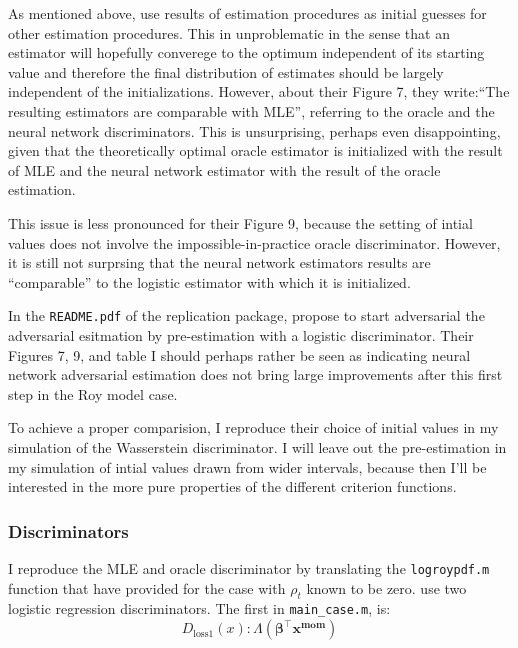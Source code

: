 As mentioned above, \textcite{kaji2023adversarial} use results of estimation procedures as initial guesses for other estimation procedures.
This in unproblematic in the sense that an estimator will hopefully converege to the optimum independent of its starting value and therefore the final distribution of estimates should be largely independent of the initializations.
However, about their Figure 7, they write:``The resulting estimators are comparable with MLE'', referring to the oracle and the neural network discriminators.
This is unsurprising, perhaps even disappointing, given that the theoretically optimal oracle estimator is initialized with the result of MLE and the neural network estimator with the result of the oracle estimation.

This issue is less pronounced for their Figure 9, because the setting of intial values does not involve the impossible-in-practice oracle discriminator.
However, it is still not surprsing that the neural network estimators results are ``comparable'' to the logistic estimator with which it is initialized.

In the \texttt{README.pdf} of the replication package, \Textcite{kaji2023adversarial} propose to start adversarial the adversarial esitmation by pre-estimation with a logistic discriminator.
Their Figures 7, 9, and table I should perhaps rather be seen as indicating neural network adversarial estimation does not bring large improvements after this first step in the Roy model case.

To achieve a proper comparision, I reproduce their choice of initial values in my simulation of the Wasserstein discriminator.
I will leave out the pre-estimation in my simulation of intial values drawn from wider intervals, because then I'll be interested in the more pure properties of the different criterion functions.

\subsubsection{Discriminators}

I reproduce the MLE and oracle discriminator by translating the \texttt{logroypdf.m} function that \textcite{kaji2023adversarial} have provided for the case with $\rho_t$ known to be zero.
\textcite{kaji2023adversarial} use two logistic regression discriminators. The first in \texttt{main\_case.m}, is:
\begin{equation}
    D_{\text{loss1}}(x) : \Lambda(\mathbf{\beta}^{\intercal} \mathbf{x^{mom}}) %
\end{equation}

